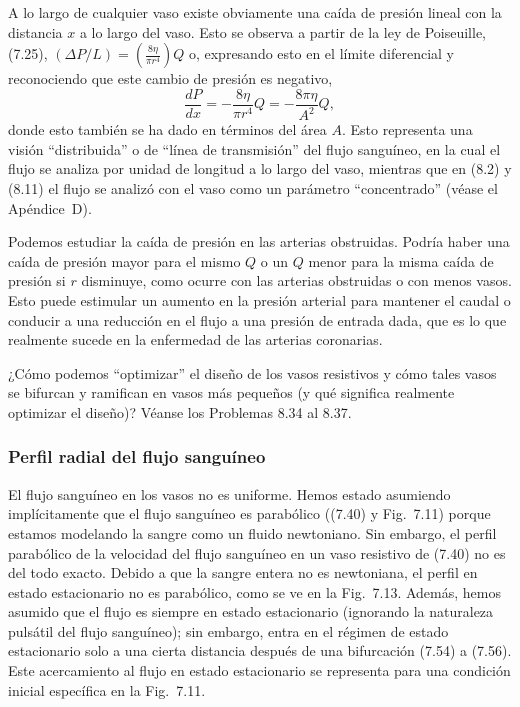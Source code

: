 \documentclass[12pt]{book}
\begin{document}
A lo largo de cualquier vaso existe obviamente una caída de presión lineal con la distancia $x$ a lo largo del vaso. Esto se observa a partir de la ley de Poiseuille, (7.25), $(\Delta P/L) = \left(\frac{8\eta}{\pi r^4}\right) Q$ o, expresando esto en el límite diferencial y reconociendo que este cambio de presión es negativo,
\begin{equation}
\frac{dP}{dx} = -\frac{8\eta}{\pi r^4} Q = -\frac{8\pi\eta}{A^2} Q,
\label{eq:814}
\end{equation}
donde esto también se ha dado en términos del área $A$. Esto representa una visión ``distribuida'' o de ``línea de transmisión'' del flujo sanguíneo, en la cual el flujo se analiza por unidad de longitud a lo largo del vaso, mientras que en (8.2) y (8.11) el flujo se analizó con el vaso como un parámetro ``concentrado'' (véase el Apéndice~D).

Podemos estudiar la caída de presión en las arterias obstruidas. Podría haber una caída de presión mayor para el mismo $Q$ o un $Q$ menor para la misma caída de presión si $r$ disminuye, como ocurre con las arterias obstruidas o con menos vasos. Esto puede estimular un aumento en la presión arterial para mantener el caudal o conducir a una reducción en el flujo a una presión de entrada dada, que es lo que realmente sucede en la enfermedad de las arterias coronarias.

¿Cómo podemos ``optimizar'' el diseño de los vasos resistivos y cómo tales vasos se bifurcan y ramifican en vasos más pequeños (y qué significa realmente optimizar el diseño)? Véanse los Problemas 8.34 al 8.37.

\subsubsection*{Perfil radial del flujo sanguíneo}

El flujo sanguíneo en los vasos no es uniforme. Hemos estado asumiendo implícitamente que el flujo sanguíneo es parabólico ((7.40) y Fig.~7.11) porque estamos modelando la sangre como un fluido newtoniano. Sin embargo, el perfil parabólico de la velocidad del flujo sanguíneo en un vaso resistivo de (7.40) no es del todo exacto. Debido a que la sangre entera no es newtoniana, el perfil en estado estacionario no es parabólico, como se ve en la Fig.~7.13. Además, hemos asumido que el flujo es siempre en estado estacionario (ignorando la naturaleza pulsátil del flujo sanguíneo); sin embargo, entra en el régimen de estado estacionario solo a una cierta distancia después de una bifurcación (7.54) a (7.56). Este acercamiento al flujo en estado estacionario se representa para una condición inicial específica en la Fig.~7.11.
\end{document}
